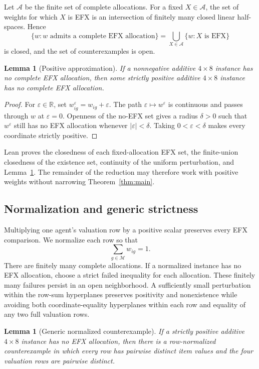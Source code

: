 \documentclass[11pt]{article}
\newtheorem{lemma}[theorem]{Lemma}
\theoremstyle{definition}
\newcommand{\M}{\mathcal{M}}
\begin{document}
Let $\mathcal A$ be the finite set of complete allocations. For a fixed
$X\in\mathcal A$, the set of weights for which $X$ is EFX is an intersection
of finitely many closed linear half-spaces. Hence
\[
  \{w:\text{$w$ admits a complete EFX allocation}\}
  =
  \bigcup_{X\in\mathcal A}\{w:\text{$X$ is EFX}\}
\]
is closed, and the set of counterexamples is open.

\begin{lemma}[Positive approximation]\label{lem:nonnegative}
If a nonnegative additive $4\times8$ instance has no complete EFX allocation,
then some strictly positive additive $4\times8$ instance has no complete EFX
allocation.
\end{lemma}

\begin{proof}
For $\varepsilon\in\mathbb R$, set
$w^\varepsilon_{ig}=w_{ig}+\varepsilon$. The path
$\varepsilon\mapsto w^\varepsilon$ is continuous and passes through $w$ at
$\varepsilon=0$. Openness of the no-EFX set gives a radius $\delta>0$ such
that $w^\varepsilon$ still has no EFX allocation whenever
$|\varepsilon|<\delta$. Taking $0<\varepsilon<\delta$ makes every coordinate
strictly positive.
\end{proof}

Lean proves the closedness of each fixed-allocation EFX set, the finite-union
closedness of the existence set, continuity of the uniform perturbation, and
Lemma~\ref{lem:nonnegative}. The remainder of the reduction may therefore
work with positive weights without narrowing Theorem~\ref{thm:main}.

\subsection{Normalization and generic strictness}

Multiplying one agent's valuation row by a positive scalar preserves every
EFX comparison. We normalize each row so that
\[
  \sum_{g\in\M}w_{ig}=1.
\]
There are finitely many complete allocations. If a normalized instance has
no EFX allocation, choose a strict failed inequality for each allocation.
These finitely many failures persist in an open neighborhood. A sufficiently
small perturbation within the row-sum hyperplanes preserves positivity and
nonexistence while avoiding both coordinate-equality hyperplanes within each
row and equality of any two full valuation rows.

\begin{lemma}[Generic normalized counterexample]\label{lem:perturb}
If a strictly positive additive $4\times8$ instance has no EFX allocation,
then there is a row-normalized counterexample in which every row has pairwise
distinct item values and the four valuation rows are pairwise distinct.
\end{lemma}
\end{document}
